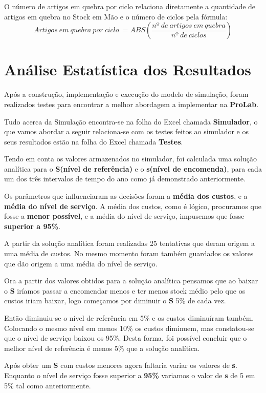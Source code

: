 \documentclass[a4paper]{article}
\begin{document}
 O número de artigos em quebra por ciclo relaciona diretamente a quantidade de artigos em quebra no Stock em Mão e o número de ciclos pela fórmula:
   $$ Artigos\ em\ quebra\ por\ ciclo\ = ABS(\frac{nº\ de\ artigos\ em\ quebra}{nº\ de\ ciclos}) $$






\section{Análise Estatística dos Resultados}

Após a construção, implementação e execução do modelo de simulação, foram realizados testes para encontrar a melhor abordagem a implementar na \textbf{ProLab}.

Tudo acerca da Simulação encontra-se na folha do Excel chamada \textbf{Simulador}, o que vamos abordar a seguir relaciona-se com os testes feitos ao simulador e os seus resultados estão na folha do Excel chamada \textbf{Testes}.

Tendo em conta os valores armazenados no simulador, foi calculada uma solução analítica para o \textbf{S(nível de referência)} e o \textbf{s(nível de encomenda)}, para cada um dos três intervalos de tempo do ano como já demonstrado anteriormente.

Os parâmetros que influenciaram as decisões foram a \textbf{média dos custos}, e a \textbf{média do nível de serviço}. A média dos custos, como é lógico, procuramos que fosse a \textbf{menor possível}, e a média do nível de serviço, impusemos que fosse \textbf{superior a 95\%}.

A partir da solução analítica foram realizadas 25 tentativas que deram origem a uma média de custos. No mesmo momento foram também guardados os valores que dão origem a uma média do nível de serviço.

Ora a partir dos valores obtidos para a solução analítica pensamos que ao baixar o \textbf{S} iríamos passar a encomendar menos e ter menos stock médio pelo que os custos iriam baixar, logo começamos por diminuir o \textbf{S} 5\% de cada vez.

Então diminuiu-se o nível de referência em 5\% e os custos diminuíram também. Colocando o mesmo nível em menos 10\% os custos diminuem, mas constatou-se que o nível de serviço baixou os 95\%. Desta forma, foi possível concluir que o melhor nível de referência é menos 5\% que a solução analítica.

Após obter um \textbf{S} com custos menores agora faltaria variar os valores de \textbf{s}. Enquanto o nível de serviço fosse superior a \textbf{95\%} variamos o valor de \textbf{s} de 5 em 5\% tal como anteriormente.
\end{document}
